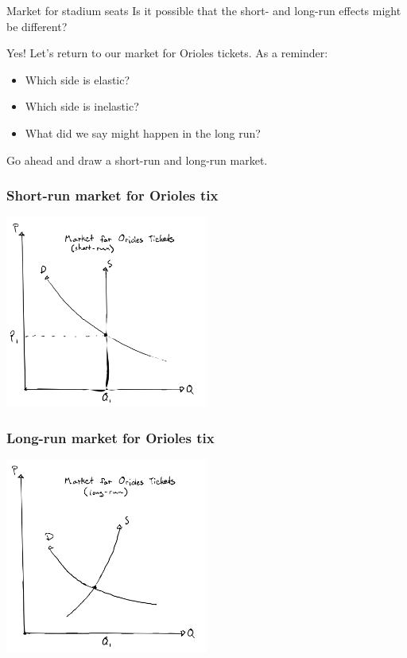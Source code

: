 \documentclass[aspectratio=169]{beamer}
\begin{document}
\begin{frame}{Market for stadium seats}
    Is it possible that the short- and long-run effects might be different?

    \vspace{5mm}

    Yes! Let's return to our market for Orioles tickets. As a reminder:
    \begin{itemize}
        \item Which side is elastic?
        \item Which side is inelastic?
        \item What did we say might happen in the long run?
    \end{itemize}

    Go ahead and draw a short-run and long-run market.
\end{frame}

\begin{frame}
    \frametitle{Short-run market for Orioles tix}
    \centering
    \includegraphics[width = 0.5\textwidth,keepaspectratio]{Orioles_short.png}
\end{frame}

\begin{frame}
    \frametitle{Long-run market for Orioles tix}
    \centering
    \includegraphics[width = 0.5\textwidth,keepaspectratio]{Orioles_long.png}
\end{frame}
\end{document}
